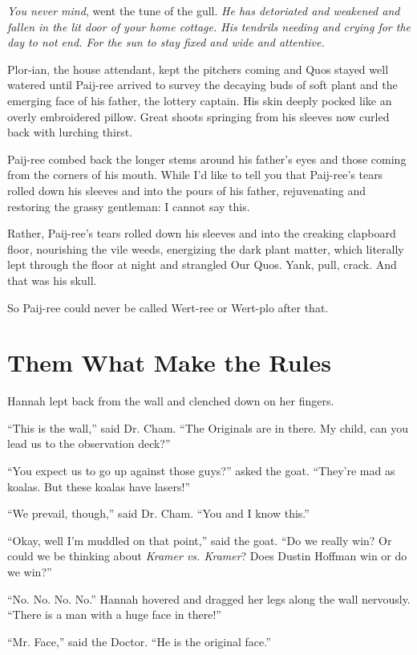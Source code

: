 \documentclass[12pt,twoside]{report}
\begin{document}
{\em You never mind}, went the tune of the gull.  {\em He has
  detoriated and weakened and fallen in the lit door of your home
  cottage.  His tendrils needing and crying for the day to not
  end. For the sun to stay fixed and wide and attentive.}

Plor-ian, the house attendant, kept the pitchers coming and Quos
stayed well watered until Paij-ree arrived to survey the decaying buds
of soft plant and the emerging face of his father, the lottery
captain.  His skin deeply pocked like an overly embroidered
pillow. Great shoots springing from his sleeves now curled back with
lurching thirst.

Paij-ree combed back the longer stems around his father's eyes and
those coming from the corners of his mouth.  While I'd like to tell
you that Paij-ree's tears rolled down his sleeves and into the pours
of his father, rejuvenating and restoring the grassy gentleman: I
cannot say this.

Rather, Paij-ree's tears rolled down his sleeves and into the creaking
clapboard floor, nourishing the vile weeds, energizing the dark plant
matter, which literally lept through the floor at night and strangled
Our Quos.  Yank, pull, crack.  And that was his skull.

So Paij-ree could never be called Wert-ree or Wert-plo after that.


\section{Them What Make the Rules}


Hannah lept back from the wall and clenched down on her fingers.

``This is the wall,'' said Dr. Cham.  ``The Originals are in there.
My child, can you lead us to the observation deck?''

``You expect us to go up against those guys?'' asked the goat.
``They're mad as koalas.  But these koalas have lasers!''

``We prevail, though,'' said Dr. Cham.  ``You and I know this.''

``Okay, well I'm muddled on that point,'' said the goat.  ``Do we
really win? Or could we be thinking about {\em Kramer vs. Kramer}?
Does Dustin Hoffman win or do we win?''

``No.  No.  No.  No.''  Hannah hovered and dragged her legs along the
wall nervously. ``There is a man with a huge face in there!''

``Mr. Face,'' said the Doctor.  ``He is the original face.''
\end{document}
